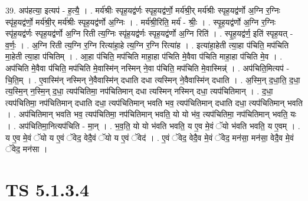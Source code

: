 \documentclass[17pt]{extarticle}
\begin{document}
39. अप॑हत्या॒ इत्यप॑ - ह॒त्यै॒ । . मर्य॑श्रीः स्पृह॒यद्व॑र्णः स्पृह॒यद्व॑र्णो॒ मर्य॑श्री॒र् मर्य॑श्रीः स्पृह॒यद्व॑र्णो अ॒ग्नि र॒ग्निः स्पृ॑ह॒यद्व॑र्णो॒ मर्य॑श्री॒र् मर्य॑श्रीः स्पृह॒यद्व॑र्णो अ॒ग्निः । . मर्य॑श्री॒रिति॒ मर्य॑ - श्रीः॒ । . स्पृ॒ह॒यद्व॑र्णो अ॒ग्नि र॒ग्निः स्पृ॑ह॒यद्व॑र्णः स्पृह॒यद्व॑र्णो अ॒ग्नि रिती त्य॒ग्निः स्पृ॑ह॒यद्व॑र्णः स्पृह॒यद्व॑र्णो अ॒ग्नि रिति॑ । . स्पृ॒ह॒यद्व॑र्ण॒ इति॑ स्पृह॒यत् - व॒र्णः॒ । . अ॒ग्नि रिती त्य॒ग्नि र॒ग्नि रित्या॑हा॒हे त्य॒ग्नि र॒ग्नि रित्या॑ह । . इत्या॑हा॒हेती त्या॒हा प॑चिति॒ मप॑चिति मा॒हेती त्या॒हा प॑चितिम् । . आ॒हा प॑चिति॒ मप॑चिति माहा॒हा प॑चिति मे॒वैवा प॑चिति माहा॒हा प॑चिति मे॒व । . अप॑चिति मे॒वैवा प॑चिति॒ मप॑चिति मे॒वास्मि॑न् नस्मिन् ने॒वा प॑चिति॒ मप॑चिति मे॒वास्मिन्न्॑ । . अप॑चिति॒मित्यप॑ - चि॒ति॒म् । . ए॒वास्मि॑न् नस्मिन् ने॒वैवास्मि॑न् दधाति दधा त्यस्मिन् ने॒वैवास्मि॑न् दधाति । . अ॒स्मि॒न् द॒धा॒ति॒ द॒धा॒ त्य॒स्मि॒न् न॒स्मि॒न् द॒धा॒ त्यप॑चितिमा॒ नप॑चितिमान् दधा त्यस्मिन् नस्मिन् दधा॒ त्यप॑चितिमान् । . द॒धा॒ त्यप॑चितिमा॒ नप॑चितिमान् दधाति दधा॒ त्यप॑चितिमान् भवति भव॒ त्यप॑चितिमान् दधाति दधा॒ त्यप॑चितिमान् भवति । . अप॑चितिमान् भवति भव॒ त्यप॑चितिमा॒ नप॑चितिमान् भवति॒ यो यो भ॑व॒ त्यप॑चितिमा॒ नप॑चितिमान् भवति॒ यः । . अप॑चितिमा॒नित्यप॑चिति - मा॒न् । . भ॒व॒ति॒ यो यो भ॑वति भवति॒ य ए॒व मे॒वं ॅयो भ॑वति भवति॒ य ए॒वम् । . य ए॒व मे॒वं ॅयो य ए॒वं ॅवेद॒ वेदै॒वं ॅयो य ए॒वं ॅवेद॑ । . ए॒वं ॅवेद॒ वेदै॒व मे॒वं ॅवेद॒ मन॑सा॒ मन॑सा॒ वेदै॒व मे॒वं ॅवेद॒ मन॑सा । \newline
\pagebreak
{}

\section{ TS 5.1.3.4 }
\end{document}
